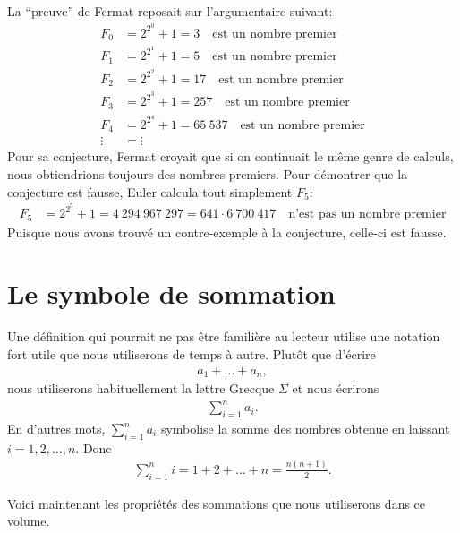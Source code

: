 \documentclass[]{book}
\theoremstyle{definition}
\theoremstyle{definition}
\theoremstyle{definition}
\theoremstyle{remark}
\begin{document}
La ``preuve'' de Fermat reposait sur l'argumentaire suivant:
\begin{align*}
F_0 &= 2^{2^0}+1 = 3 \quad \text{est un nombre premier} \\
F_1 &= 2^{2^1}+1 = 5 \quad \text{est un nombre premier} \\
F_2 &= 2^{2^2}+1 = 17 \quad \text{est un nombre premier} \\
F_3 &= 2^{2^3}+1 = 257 \quad \text{est un nombre premier} \\
F_4 &= 2^{2^4}+1 = 65\ 537 \quad \text{est un nombre premier} \\
\vdots &= \vdots 
\end{align*}
Pour sa conjecture, Fermat croyait que si on continuait le même genre de calculs, nous obtiendrions toujours des nombres premiers. Pour démontrer que la conjecture est fausse, Euler calcula tout simplement \(F_5\):
\begin{align*}
F_5 &= 2^{2^5}+1 = 4\ 294\ 967\ 297 = 641 \cdot 6\ 700\ 417 \quad \text{n'est pas un nombre premier}
\end{align*}
Puisque nous avons trouvé un contre-exemple à la conjecture, celle-ci est fausse.

\hypertarget{sommation}{%
\chapter{Le symbole de sommation}\label{sommation}}

Une définition qui pourrait ne pas être familière au lecteur utilise une notation fort utile que nous utiliserons de temps à autre. Plutôt que d'écrire
\begin{align*}
a_1+\ldots+a_n,
\end{align*}
nous utiliserons habituellement la lettre Grecque \(\Sigma\) et nous écrirons
\begin{align*}
\sum_{i=1}^n a_i.
\end{align*}
En d'autres mots, \(\sum_{i=1}^n a_i\) symbolise la somme des nombres obtenue en laissant \(i=1,2,\ldots,n\). Donc
\begin{align*}
\sum_{i=1}^n i = 1+2+\ldots+n=\frac{n(n+1)}{2}.
\end{align*}

Voici maintenant les propriétés des sommations que nous utiliserons dans ce volume.
\end{document}
